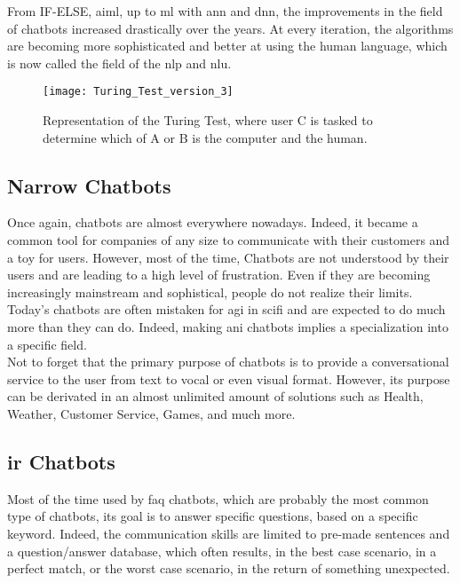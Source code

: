 From IF-ELSE, \gls{aiml}, up to \gls{ml} with \gls{ann} and \gls{dnn}, the improvements in the field of chatbots increased drastically over the years. At every iteration, the algorithms are becoming more sophisticated and better at using the human language, which is now called the field of the \gls{nlp} and \gls{nlu}.

\begin{figure}[ht!]
    \centering
    \texttt{[image: Turing\_Test\_version\_3]}
    \caption{
       Representation of the Turing Test, where user C is tasked to determine which of A or B is the computer and the human. \cite{wikipedia:turing_test_img}
    }
    \label{fig:wikipedia_turing_test_img}
\end{figure}

\subsection{Narrow Chatbots}
Once again, chatbots are almost everywhere nowadays. Indeed, it became a common tool for companies of any size to communicate with their customers and a toy for users. However, most of the time, Chatbots are not understood by their users and are leading to a high level of frustration. Even if they are becoming increasingly mainstream and sophistical, people do not realize their limits. Today's chatbots are often mistaken for \gls{agi} in \gls{scifi} and are expected to do much more than they can do. Indeed, making \gls{ani} chatbots implies a specialization into a specific field.\\

Not to forget that the primary purpose of chatbots is to provide a conversational service to the user from text to vocal or even visual format. However, its purpose can be derivated in an almost unlimited amount of solutions such as Health, Weather, Customer Service, Games, and much more.

\subsection{\gls{ir} Chatbots}
Most of the time used by \gls{faq} chatbots, which are probably the most common type of chatbots, its goal is to answer specific questions, based on a specific keyword. Indeed, the communication skills are limited to pre-made sentences and a question/answer database, which often results, in the best case scenario, in a perfect match, or the worst case scenario, in the return of something unexpected.\\

